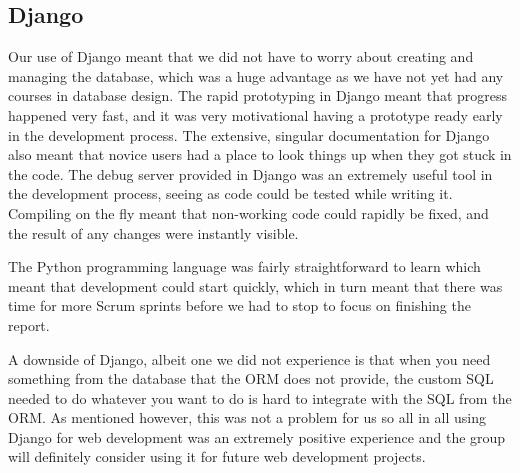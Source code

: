 \subsection{Django}
Our use of Django meant that we did not have to worry about creating and managing the database, which was a huge advantage as we have not yet had any courses in database design. The
rapid prototyping in Django meant that progress happened very fast, and it was very motivational having a prototype ready
early in the development process. The extensive, singular documentation for Django also meant that novice users had a place to look things up when they got stuck in the code. 
The debug server provided in Django was an extremely useful tool in the development process, seeing as code could be tested
while writing it. Compiling on the fly meant that non-working code could rapidly be fixed, and the result of any changes were instantly visible.

The Python programming language was fairly straightforward to learn which meant that development could start quickly, which in
turn meant that there was time for more Scrum sprints before we had to stop to focus on finishing the report. 

A downside of Django, albeit one we did not experience is that when you need something from the database that the ORM does not provide, the custom SQL needed to do whatever you want to do is hard to integrate with the SQL from the ORM. As mentioned however, this was not a problem for us so all in all using Django for web development was an extremely positive experience
and the group will definitely consider using it for future web development projects.